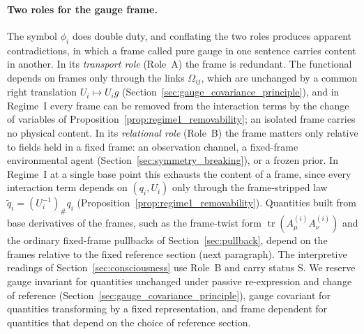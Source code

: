 \documentclass[11pt]{article}
\begin{document}
\paragraph{Two roles for the gauge frame.} The symbol $\phi_i$ does double duty, and conflating the two roles produces apparent contradictions, in which a frame called pure gauge in one sentence carries content in another. In its \emph{transport role} (Role~A) the frame is redundant. The functional depends on frames only through the links $\Omega_{ij}$, which are unchanged by a common right translation $U_i \mapsto U_i g$ (Section~\ref{sec:gauge_covariance_principle}), and in Regime~I every frame can be removed from the interaction terms by the change of variables of Proposition~\ref{prop:regime1_removability}; an isolated frame carries no physical content. In its \emph{relational role} (Role~B) the frame matters only relative to fields held in a fixed frame: an observation channel, a fixed-frame environmental agent (Section~\ref{sec:symmetry_breaking}), or a frozen prior. In Regime~I at a single base point this exhausts the content of a frame, since every interaction term depends on $(q_i, U_i)$ only through the frame-stripped law $\tilde q_i = (U_i^{-1})_\# q_i$ (Proposition~\ref{prop:regime1_removability}). Quantities built from base derivatives of the frames, such as the frame-twist form $\operatorname{tr}(A^{(i)}_\mu A^{(i)}_\nu)$ and the ordinary fixed-frame pullbacks of Section~\ref{sec:pullback}, depend on the frames relative to the fixed reference section (next paragraph). The interpretive readings of Section~\ref{sec:consciousness} use Role~B and carry status S. We reserve gauge invariant for quantities unchanged under passive re-expression and change of reference (Section~\ref{sec:gauge_covariance_principle}), gauge covariant for quantities transforming by a fixed representation, and frame dependent for quantities that depend on the choice of reference section.
\end{document}
